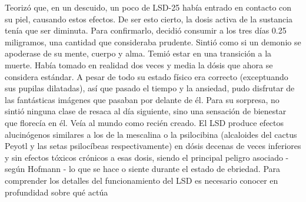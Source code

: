 Teorizó que, en un descuido, un poco de LSD-25 había entrado en contacto con su piel, causando estos efectos. De ser esto cierto, la dosis activa de la sustancia tenía que ser diminuta. Para confirmarlo, decidió consumir a los tres días 0.25 miligramos, una cantidad que consideraba prudente. Sintió como si un demonio se apoderase de su mente, cuerpo y alma. Temió estar en una transición a la muerte. Había tomado en realidad dos veces y media la dósis que ahora se considera estándar. A pesar de todo su estado físico era correcto (exceptuando sus pupilas dilatadas), así que pasado el tiempo y la ansiedad, pudo disfrutar de las fantásticas imágenes que pasaban por delante de él. Para su sorpresa, no sintió ninguna clase de resaca al día siguiente, sino una sensación de bienestar que florecía en él. Veía al mundo como recién creado. El LSD produce efectos alucinógenos similares a los de la mescalina o la psilocibina (alcaloides del cactus Peyotl y las setas psilocíbeas respectivamente) en dósis decenas de veces inferiores y sin efectos tóxicos crónicos a esas dosis, siendo el principal peligro asociado - según Hofmann - lo que se hace o siente durante el estado de ebriedad. Para comprender los detalles del funcionamiento del LSD es necesario conocer en profundidad sobre qué actúa
